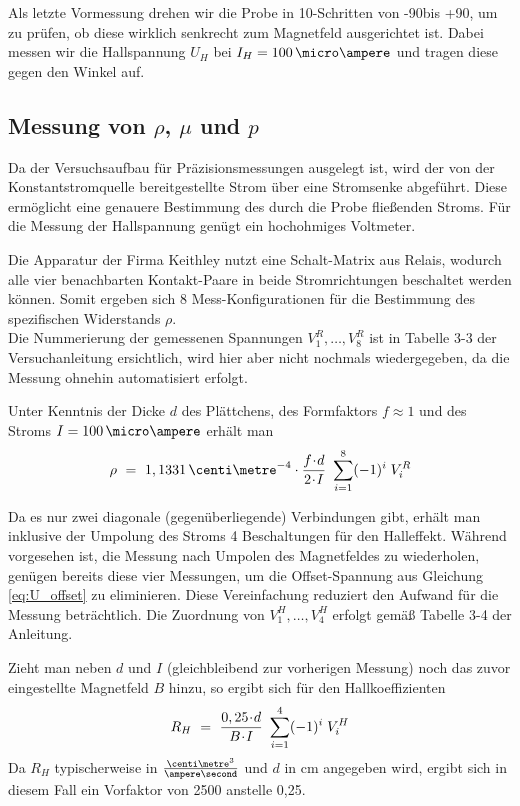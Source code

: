 Als letzte Vormessung drehen wir die Probe in 10\degree-Schritten von -90\degree bis +90\degree, um zu prüfen, ob diese wirklich senkrecht zum Magnetfeld ausgerichtet ist. Dabei messen wir die Hallspannung $U_H$ bei $I_H = 100\,\micro\ampere$ und tragen diese gegen den Winkel auf.

\newpage
\subsection{Messung von $\rho$, $\mu$ und $p$}

Da der Versuchsaufbau für Präzisionsmessungen ausgelegt ist, wird der von der Konstantstromquelle bereitgestellte Strom über eine Stromsenke abgeführt. Diese ermöglicht eine genauere Bestimmung des durch die Probe fließenden Stroms. Für die Messung der Hallspannung genügt ein hochohmiges Voltmeter.

Die Apparatur der Firma Keithley nutzt eine Schalt-Matrix aus Relais, wodurch alle vier benachbarten Kontakt-Paare in beide Stromrichtungen beschaltet werden können. Somit ergeben sich 8 Mess-Konfigurationen für die Bestimmung des spezifischen Widerstands $\rho$.\\
Die Nummerierung der gemessenen Spannungen $V^R_1, \dots, V^R_8$ ist in Tabelle 3-3 der Versuchanleitung ersichtlich, wird hier aber nicht nochmals wiedergegeben, da die Messung ohnehin automatisiert erfolgt.

Unter Kenntnis der Dicke $d$ des Plättchens, des Formfaktors $f \approx 1$ und des Stroms  $I = 100\,\micro\ampere$ erhält man\\[-1.2em]
\begin{equation}
\rho ~=~ 1,1331 \,\centi\metre^{-4} \cdot \frac{f \cdt d}{2 \cdt I} ~ \sum\limits_{i=1}^8 (-1)^i \; V^R_i
\end{equation}

Da es nur zwei \glqq diagonale\grqq{} (gegenüberliegende) Verbindungen gibt, erhält man inklusive der Umpolung des Stroms 4 Beschaltungen für den Halleffekt. Während vorgesehen ist, die Messung nach Umpolen des Magnetfeldes zu wiederholen, genügen bereits diese vier Messungen, um die Offset-Spannung aus Gleichung \eqref{eq:U_offset} zu eliminieren. Diese Vereinfachung reduziert den Aufwand für die Messung beträchtlich. Die Zuordnung von $V^H_1, \dots, V^H_4$ erfolgt gemäß Tabelle 3-4 der Anleitung.

Zieht man neben $d$ und $I$ (gleichbleibend zur vorherigen Messung) noch das zuvor eingestellte Magnetfeld $B$ hinzu, so ergibt sich für den Hallkoeffizienten 
\begin{equation}
R_H ~=~ \frac{0,25 \!\cdot\! d}{B \!\cdot\! I} ~ \sum\limits_{i=1}^4 (-1)^i \; V^H_i
\end{equation}
Da $R_H$ typischerweise in $\tfrac{\centi\metre^3}{\ampere\second}$ und $d$ in cm angegeben wird, ergibt sich in diesem Fall ein Vorfaktor von 2500 anstelle 0,25.

